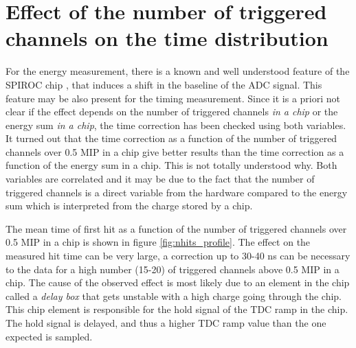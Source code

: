 \section{Effect of the number of triggered channels on the time distribution}
\label{subsec:ped_shift}

For the energy measurement, there is a known and well understood feature of the SPIROC chip \cite{Hartbrich2012}, that induces a shift in the baseline of the ADC signal. This feature may be also present for the timing measurement. Since it is a priori not clear if the effect depends on the number of triggered channels \textit{in a chip} or the energy sum \textit{in a chip}, the time correction has been checked using both variables. It turned out that the time correction as a function of the number of triggered channels over 0.5 MIP in a chip give better results than the time correction as a function of the energy sum in a chip. This is not totally understood why. Both variables are correlated and it may be due to the fact that the number of triggered channels is a direct variable from the hardware compared to the energy sum which is interpreted from the charge stored by a chip.

The mean time of first hit as a function of the number of triggered channels over 0.5 MIP in a chip is shown in figure \ref{fig:nhits_profile}. The effect on the measured hit time can be very large, a correction up to 30-40 ns can be necessary to the data for a high number (15-20) of triggered channels above 0.5 MIP in a chip. The cause of the observed effect is most likely due to an element in the chip called a \textit{delay box} that gets unstable with a high charge going through the chip. This chip element is responsible for the hold signal of the TDC ramp in the chip. The hold signal is delayed, and thus a higher TDC ramp value than the one expected is sampled.

